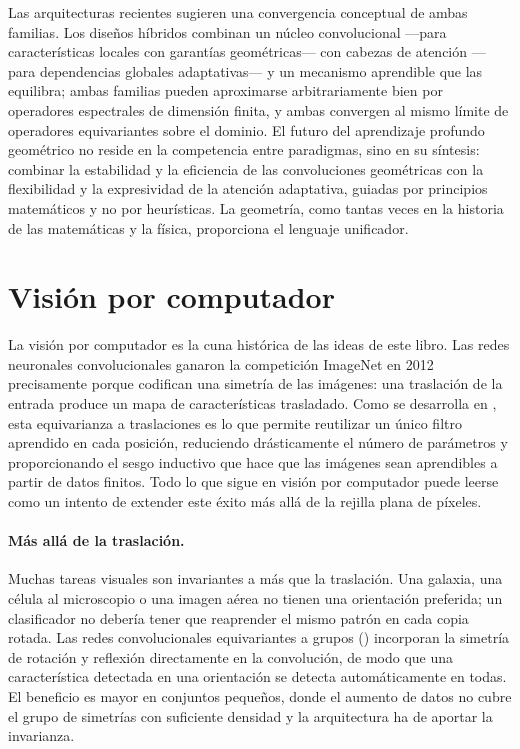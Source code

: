 \begin{remark}
\label{rem:apps:convergence}
Las arquitecturas recientes sugieren una convergencia conceptual de ambas
familias. Los dise\~nos h\'ibridos combinan un n\'ucleo convolucional ---para
caracter\'isticas locales con garant\'ias geom\'etricas--- con cabezas de
atenci\'on ---para dependencias globales adaptativas--- y un mecanismo aprendible
que las equilibra; ambas familias pueden aproximarse arbitrariamente bien por
operadores espectrales de dimensi\'on finita, y ambas convergen al mismo l\'imite
de operadores equivariantes sobre el dominio. El futuro del aprendizaje profundo
geom\'etrico no reside en la competencia entre paradigmas, sino en su s\'intesis:
combinar la estabilidad y la eficiencia de las convoluciones geom\'etricas con la
flexibilidad y la expresividad de la atenci\'on adaptativa, guiadas por
principios matem\'aticos y no por heur\'isticas. La geometr\'ia, como tantas
veces en la historia de las matem\'aticas y la f\'isica, proporciona el lenguaje
unificador.
\end{remark}

\section{Visi\'on por computador}
\label{sec:apps:vision}

La visi\'on por computador es la cuna hist\'orica de las ideas de este libro.
Las redes neuronales convolucionales ganaron la competici\'on ImageNet en
2012~\citep{krizhevsky2012alexnet} precisamente porque codifican una simetr\'ia
de las im\'agenes: una traslaci\'on de la entrada produce un mapa de
caracter\'isticas trasladado. Como se desarrolla en , esta
equivarianza a traslaciones es lo que permite reutilizar un \'unico filtro
aprendido en cada posici\'on, reduciendo dr\'asticamente el n\'umero de
par\'ametros y proporcionando el sesgo inductivo que hace que las im\'agenes
sean aprendibles a partir de datos finitos. Todo lo que sigue en visi\'on por
computador puede leerse como un intento de extender este \'exito m\'as all\'a de
la rejilla plana de p\'ixeles.

\paragraph{M\'as all\'a de la traslaci\'on.}
Muchas tareas visuales son invariantes a m\'as que la traslaci\'on. Una galaxia,
una c\'elula al microscopio o una imagen a\'erea no tienen una orientaci\'on
preferida; un clasificador no deber\'ia tener que reaprender el mismo patr\'on en
cada copia rotada. Las redes convolucionales equivariantes a grupos
() incorporan la simetr\'ia de rotaci\'on y reflexi\'on
directamente en la convoluci\'on, de modo que una caracter\'istica detectada en
una orientaci\'on se detecta autom\'aticamente en todas. El beneficio es mayor en
conjuntos peque\~nos, donde el aumento de datos no cubre el grupo de simetr\'ias
con suficiente densidad y la arquitectura ha de aportar la invarianza.


